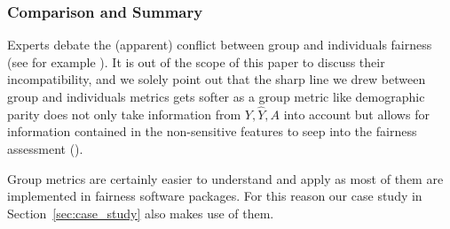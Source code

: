 

\subsubsection*{Comparison and Summary}
Experts debate the (apparent) conflict between group and individuals fairness (see for example \cite{Binns2020}).
It is out of the scope of this paper to discuss their incompatibility, and we solely point out that the sharp line we drew between group and individuals metrics gets softer as a group metric like demographic parity does not only take information from $Y, \hat{Y}, A$ into account but allows for information contained in the non-sensitive features to seep into the fairness assessment (\cite{castelnovo2022}).\par
Group metrics are certainly easier to understand and apply as most of them are implemented in fairness software packages. For this reason our case study in Section~\ref{sec:case_study} also makes use of them.




